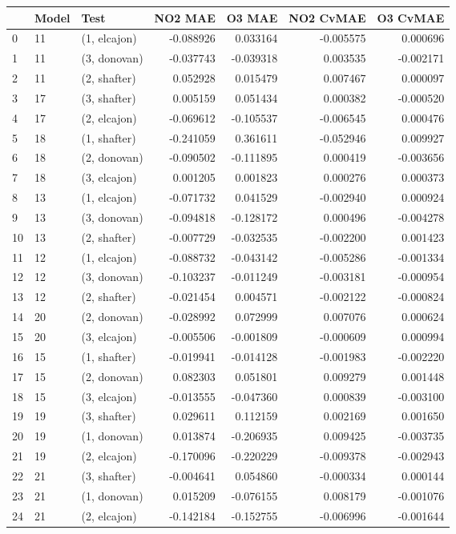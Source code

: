\begin{tabular}{lllrrrr}
\toprule
{} & Model &          Test &   NO2 MAE &    O3 MAE &  NO2 CvMAE &  O3 CvMAE \\
\midrule
0  &    11 &  (1, elcajon) & -0.088926 &  0.033164 &  -0.005575 &  0.000696 \\
1  &    11 &  (3, donovan) & -0.037743 & -0.039318 &   0.003535 & -0.002171 \\
2  &    11 &  (2, shafter) &  0.052928 &  0.015479 &   0.007467 &  0.000097 \\
3  &    17 &  (3, shafter) &  0.005159 &  0.051434 &   0.000382 & -0.000520 \\
4  &    17 &  (2, elcajon) & -0.069612 & -0.105537 &  -0.006545 &  0.000476 \\
5  &    18 &  (1, shafter) & -0.241059 &  0.361611 &  -0.052946 &  0.009927 \\
6  &    18 &  (2, donovan) & -0.090502 & -0.111895 &   0.000419 & -0.003656 \\
7  &    18 &  (3, elcajon) &  0.001205 &  0.001823 &   0.000276 &  0.000373 \\
8  &    13 &  (1, elcajon) & -0.071732 &  0.041529 &  -0.002940 &  0.000924 \\
9  &    13 &  (3, donovan) & -0.094818 & -0.128172 &   0.000496 & -0.004278 \\
10 &    13 &  (2, shafter) & -0.007729 & -0.032535 &  -0.002200 &  0.001423 \\
11 &    12 &  (1, elcajon) & -0.088732 & -0.043142 &  -0.005286 & -0.001334 \\
12 &    12 &  (3, donovan) & -0.103237 & -0.011249 &  -0.003181 & -0.000954 \\
13 &    12 &  (2, shafter) & -0.021454 &  0.004571 &  -0.002122 & -0.000824 \\
14 &    20 &  (2, donovan) & -0.028992 &  0.072999 &   0.007076 &  0.000624 \\
15 &    20 &  (3, elcajon) & -0.005506 & -0.001809 &  -0.000609 &  0.000994 \\
16 &    15 &  (1, shafter) & -0.019941 & -0.014128 &  -0.001983 & -0.002220 \\
17 &    15 &  (2, donovan) &  0.082303 &  0.051801 &   0.009279 &  0.001448 \\
18 &    15 &  (3, elcajon) & -0.013555 & -0.047360 &   0.000839 & -0.003100 \\
19 &    19 &  (3, shafter) &  0.029611 &  0.112159 &   0.002169 &  0.001650 \\
20 &    19 &  (1, donovan) &  0.013874 & -0.206935 &   0.009425 & -0.003735 \\
21 &    19 &  (2, elcajon) & -0.170096 & -0.220229 &  -0.009378 & -0.002943 \\
22 &    21 &  (3, shafter) & -0.004641 &  0.054860 &  -0.000334 &  0.000144 \\
23 &    21 &  (1, donovan) &  0.015209 & -0.076155 &   0.008179 & -0.001076 \\
24 &    21 &  (2, elcajon) & -0.142184 & -0.152755 &  -0.006996 & -0.001644 \\
\bottomrule
\end{tabular}
